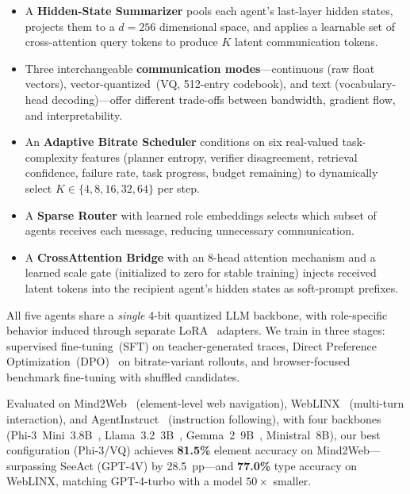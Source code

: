 \documentclass{article}
\begin{document}
\begin{itemize}[leftmargin=*,itemsep=1pt,topsep=2pt]
\item A \textbf{Hidden-State Summarizer} pools each agent's last-layer hidden states, projects them to a $d{=}256$ dimensional space, and applies a learnable set of cross-attention query tokens to produce $K$ latent communication tokens.
\item Three interchangeable \textbf{communication modes}---continuous (raw float vectors), vector-quantized~(VQ, 512-entry codebook), and text (vocabulary-head decoding)---offer different trade-offs between bandwidth, gradient flow, and interpretability.
\item An \textbf{Adaptive Bitrate Scheduler} conditions on six real-valued task-complexity features (planner entropy, verifier disagreement, retrieval confidence, failure rate, task progress, budget remaining) to dynamically select $K\!\in\!\{4,8,16,32,64\}$ per step.
\item A \textbf{Sparse Router} with learned role embeddings selects which subset of agents receives each message, reducing unnecessary communication.
\item A \textbf{CrossAttention Bridge} with an 8-head attention mechanism and a learned scale gate (initialized to zero for stable training) injects received latent tokens into the recipient agent's hidden states as soft-prompt prefixes.
\end{itemize}

All five agents share a \emph{single} 4-bit quantized LLM backbone, with role-specific behavior induced through separate LoRA~\cite{hu2022lora} adapters.  We train in three stages: supervised fine-tuning~(SFT) on teacher-generated traces, Direct Preference Optimization~(DPO)~\cite{rafailov2023dpo} on bitrate-variant rollouts, and browser-focused benchmark fine-tuning with shuffled candidates.

Evaluated on Mind2Web~\cite{deng2024mind2web} (element-level web navigation), WebLINX~\cite{lu2024weblinx} (multi-turn interaction), and AgentInstruct~\cite{zeng2024agentinstruct} (instruction following), with four backbones (Phi-3~Mini~3.8B~\cite{abdin2024phi3}, Llama~3.2~3B~\cite{grattafiori2024llama3}, Gemma~2~9B~\cite{team2024gemma2}, Ministral~8B), our best configuration (Phi-3/VQ) achieves \textbf{81.5\%} element accuracy on Mind2Web---surpassing SeeAct (GPT-4V) by 28.5~pp---and \textbf{77.0\%} type accuracy on WebLINX, matching GPT-4-turbo with a model $50\times$ smaller.
\end{document}
